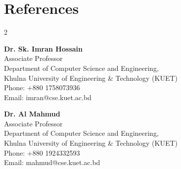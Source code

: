 \documentclass[letterpaper,11pt]{article}
\begin{document}
\section*{References}
\vspace{2pt}
    \setlength{\columnsep}{50pt}
    \begin{multicols}{2}

    \noindent
    \textbf{Dr. Sk. Imran Hossain} \\
    Associate Professor \\
    Department of Computer Science and Engineering,\\
    Khulna University of Engineering \& Technology (KUET) \\
    Phone: +880 1758073936 \\
    Email: imran@cse.kuet.ac.bd

    \columnbreak
    \noindent
    \textbf{Dr. Al Mahmud} \\
    Associate Professor \\
    Department of Computer Science and Engineering,\\
    Khulna University of Engineering \& Technology (KUET) \\
    Phone: +880 1924332593 \\
    Email: mahmud@cse.kuet.ac.bd


    \end{multicols}
\end{document}
